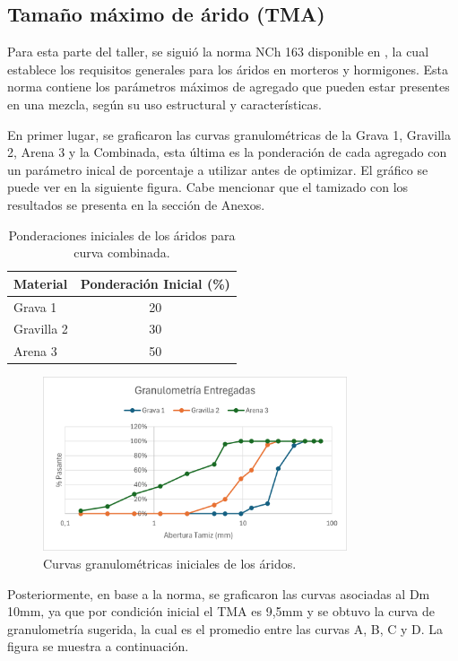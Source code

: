 \subsection{Tamaño máximo de árido (TMA)}

Para esta parte del taller, se siguió la norma NCh 163 disponible en \cite{NCh1632013}, la cual establece los requisitos generales para los áridos en morteros y hormigones. Esta norma contiene los parámetros máximos de agregado que pueden estar presentes en una mezcla, según su uso estructural y características.

En primer lugar, se graficaron las curvas granulométricas de la Grava 1, Gravilla 2, Arena 3 y la Combinada, esta última es la ponderación de cada agregado con un parámetro inical de porcentaje a utilizar antes de optimizar. El gráfico se puede ver en la siguiente figura. Cabe mencionar que el tamizado con los resultados se presenta en la sección de Anexos.

\begin{table}[H]
\centering
\caption{Ponderaciones iniciales de los áridos para curva combinada.}
\begin{tabular}{|l|c|}
\hline
\textbf{Material} & \textbf{Ponderación Inicial (\%)} \\ \hline
Grava 1     & 20 \\ \hline
Gravilla 2  & 30 \\ \hline
Arena 3     & 50 \\ \hline
\end{tabular}
\end{table}


\begin{figure}[H]
    \centering
    \includegraphics[width=0.8\textwidth]{GRAFICOS/granu_inicial.png}
    \caption{Curvas granulométricas iniciales de los áridos.}
\end{figure}

Posteriormente, en base a la norma, se graficaron las curvas asociadas al Dm 10mm, ya que por condición inicial el TMA es 9,5mm y se obtuvo la curva de granulometría sugerida, la cual es el promedio entre las curvas A, B, C y D. La figura se muestra a continuación.

